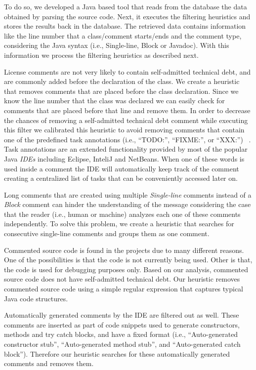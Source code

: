 To do so, we developed a Java based tool that reads from the database the data obtained by parsing the source code. Next, it executes the filtering heuristics and stores the results back in the database. The retrieved data contains information like the line number that a class/comment starts/ends and the comment type, considering the Java syntax (i.e., Single-line, Block or Javadoc). With this information we process the filtering heuristics as described next.

License comments are not very likely to contain self-admitted technical debt, and are commonly added before the declaration of the class. We create a heuristic that removes comments that are placed before the class declaration. Since we know the line number that the class was declared we can easily check for comments that are placed before that line and remove them. In order to decrease the chances of removing a self-admitted technical debt comment while executing this filter we calibrated this heuristic to avoid removing comments that contain one of the predefined task annotations (i.e., ``TODO:'', ``FIXME:'', or ``XXX:'') ~\cite{Storey2008ICSE}. Task annotations are an extended functionality provided by most of the popular Java \textit{IDEs} including Eclipse, InteliJ and NetBeans. When one of these words is used inside a comment the IDE will automatically keep track of the comment creating a centralized list of tasks that can be conveniently accessed later on.

Long comments that are created using multiple \emph{Single-line} comments instead of a \emph{Block} comment can hinder the understanding of the message considering the case that the reader (i.e., human or machine) analyzes each one of these comments independently. To solve this problem, we create a heuristic that searches for consecutive single-line comments and groups them as one comment.
 
Commented source code is found in the projects due to many different reasons. One of the possibilities is that the code is not currently being used. Other is that, the code is used for debugging purposes only. Based on our analysis, commented source code does not have self-admitted technical debt. Our heuristic removes commented source code using a simple regular expression that captures typical Java code structures.

Automatically generated comments by the IDE are filtered out as well. These comments are inserted as part of code snippets used to generate constructors, methods and try catch blocks, and have a fixed format (i.e., ``Auto-generated constructor stub'', ``Auto-generated method stub'', and ``Auto-generated catch block''). Therefore our heuristic searches for these automatically generated comments and removes them. 


